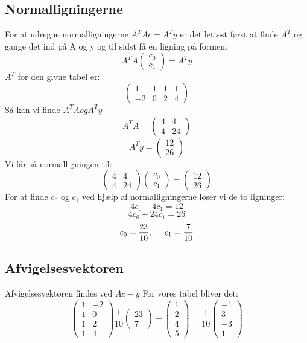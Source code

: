 \documentclass{article}
\begin{document}
\subsection{Normalligningerne}
For at udregne normalligningerne $A^TAc=A^Ty$ er det lettest først at finde 
$A^T$ og gange det ind på A og y og til sidst få en ligning på formen:
$$A^TA
\begin{pmatrix}
c_0\\c_1
\end{pmatrix} = A^Ty$$
$A^T$ for den givne tabel er:
$$\begin{pmatrix}
1 & 1 & 1 & 1\\
-2 & 0 & 2 & 4
\end{pmatrix}$$
Så kan vi finde $A^TA og A^Ty$
$$A^TA=\begin{pmatrix}
4 & 4\\
4 & 24
\end{pmatrix}$$
$$A^Ty=\begin{pmatrix}
12\\
26
\end{pmatrix}$$
Vi får så normalligningen til:
$$\begin{pmatrix}
4 & 4\\
4 & 24
\end{pmatrix}
\begin{pmatrix}
c_0\\c_1
\end{pmatrix} =
\begin{pmatrix}
12\\26
\end{pmatrix}$$
For at finde $c_0$ og $c_1$ ved hjælp af normalligningerne løser vi de to 
ligninger:
$$4c_0+4c_1=12$$
$$4c_0+24c_1=26$$
$$c_0 = \frac{23}{10}, \hspace{5mm} c_1 = \frac{7}{10}$$

\subsection{Afvigelsesvektoren}
Afvigelsesvektoren findes ved $Ac-y$
For vores tabel bliver det:
$$\begin{pmatrix}
1&-2\\
1&0\\
1&2\\
1&4
\end{pmatrix}
\frac{1}{10}\begin{pmatrix}
23\\7
\end{pmatrix}
-
\begin{pmatrix}
1\\
2\\
4\\
5
\end{pmatrix}
=
\frac{1}{10}\begin{pmatrix}
-1\\
3\\
-3\\
1
\end{pmatrix}$$
\end{document}
